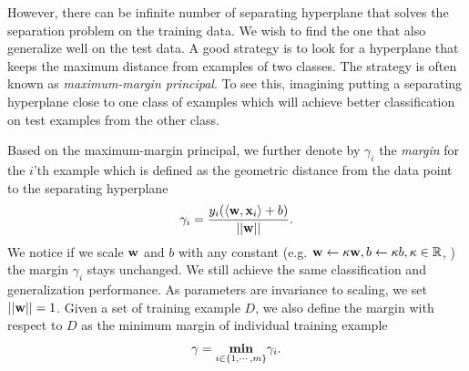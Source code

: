 However, there can be infinite number of separating hyperplane that solves the separation problem on the training data.
We wish to find the one that also generalize well on the test data.
A good strategy is to look for a hyperplane that keeps the maximum distance from examples of two classes.
The strategy is often known as \textit{maximum-margin principal}.
To see this, imagining putting a separating hyperplane close to one class of examples which will achieve better classification on test examples from the other class.

Based on the maximum-margin principal, we further denote by $\gamma_i$ the \textit{margin} for the $i$'th example which is defined as the geometric distance from the data point to the separating hyperplane
\begin{align*}
	\gamma_i = \frac{y_i(\langle \mathbf {w}, \mathbf {x}_i \rangle+b)}{\left|\left| \mathbf {w} \right|\right|}.
\end{align*}
We notice if we scale $\mathbf {w}$ and $b$ with any constant (e.g. $\mathbf {w}\leftarrow\kappa\mathbf {w}, b\leftarrow\kappa b, \kappa\in\mathbb{R}$, ) the margin $\gamma_i$ stays unchanged. 
We still achieve the same classification and generalization performance.
As parameters are invariance to scaling, we set $\left|\left| \mathbf {w} \right|\right|=1$.
Given a set of training example $D$, we also define the margin with respect to $D$ as the minimum margin of individual training example
\begin{align*}
	\gamma = \underset{i\in\{1,\cdots,m\}}{\textbf{min}}\gamma_i.
\end{align*}

